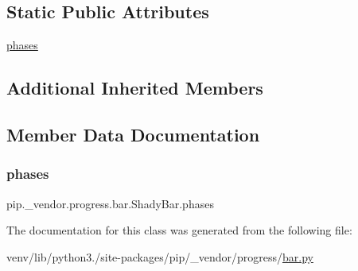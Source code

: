 \subsection*{Static Public Attributes}
\begin{DoxyCompactItemize}
\item 
\hyperlink{classpip_1_1__vendor_1_1progress_1_1bar_1_1ShadyBar_aed266cf9dba1cbaaea8241cec2a55ed2}{phases}
\end{DoxyCompactItemize}
\subsection*{Additional Inherited Members}


\subsection{Member Data Documentation}
\mbox{\label{classpip_1_1__vendor_1_1progress_1_1bar_1_1ShadyBar_aed266cf9dba1cbaaea8241cec2a55ed2}} 
\subsubsection{\texorpdfstring{phases}{phases}}
{\footnotesize\ttfamily pip.\+\_\+vendor.\+progress.\+bar.\+Shady\+Bar.\+phases\hspace{0.3cm}{\ttfamily [static]}}



The documentation for this class was generated from the following file\+:\begin{DoxyCompactItemize}
\item 
venv/lib/python3./site-\/packages/pip/\+\_\+vendor/progress/\hyperlink{bar_8py}{bar.\+py}\end{DoxyCompactItemize}
